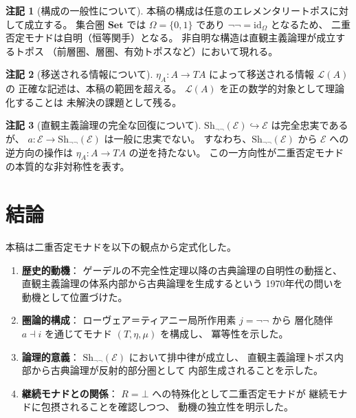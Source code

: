 \documentclass[11pt,a4paper]{article}
\theoremstyle{definition}
\newtheorem{remark}{注記}[section]
\newcommand{\Sh}{\mathrm{Sh}_{\neg\neg}}
\newcommand{\topos}{\mathcal{E}}
\newcommand{\id}{\mathrm{id}}
\begin{document}
\begin{remark}[構成の一般性について]
本稿の構成は任意のエレメンタリートポスに対して成立する。
集合圏 $\mathbf{Set}$ では $\Omega = \{0,1\}$ であり
$\neg\neg = \id_\Omega$ となるため、
二重否定モナドは自明（恒等関手）となる。
非自明な構造は直観主義論理が成立するトポス
（前層圏、層圏、有効トポスなど）において現れる。
\end{remark}

\begin{remark}[移送される情報について]
$\eta_A: A \to TA$ によって移送される情報 $\mathcal{L}(A)$ の
正確な記述は、本稿の範囲を超える。
$\mathcal{L}(A)$ を正の数学的対象として理論化することは
未解決の課題として残る。
\end{remark}

\begin{remark}[直観主義論理の完全な回復について]
$\Sh(\topos) \hookrightarrow \topos$ は完全忠実であるが、
$a: \topos \to \Sh(\topos)$ は一般に忠実でない。
すなわち、$\Sh(\topos)$ から $\topos$ への逆方向の操作は
$\eta_A: A \to TA$ の逆を持たない。
この一方向性が二重否定モナドの本質的な非対称性を表す。
\end{remark}

\section{結論}

本稿は二重否定モナドを以下の観点から定式化した。

\begin{enumerate}
\item \textbf{歴史的動機}：
  ゲーデルの不完全性定理以降の古典論理の自明性の動揺と、
  直観主義論理の体系内部から古典論理を生成するという
  1970年代の問いを動機として位置づけた。

\item \textbf{圏論的構成}：
  ローヴェア＝ティアニー局所作用素 $j = \neg\neg$ から
  層化随伴 $a \dashv i$ を通じてモナド $(T, \eta, \mu)$ を構成し、
  冪等性を示した。

\item \textbf{論理的意義}：
  $\Sh(\topos)$ において排中律が成立し、
  直観主義論理トポス内部から古典論理が反射的部分圏として
  内部生成されることを示した。

\item \textbf{継続モナドとの関係}：
  $R = \bot$ への特殊化として二重否定モナドが
  継続モナドに包摂されることを確認しつつ、
  動機の独立性を明示した。
\end{enumerate}
\end{document}

